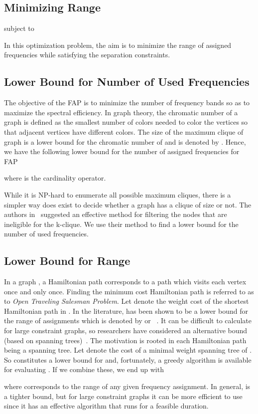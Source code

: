 \documentclass[10pt,twocolumn,twoside]{JCNtran}
\newcommand{\tbirkan}[1]{#1}
\begin{document}
\subsection{Minimizing Range}
\label{subsec_min_range}

subject to



In this optimization problem, the aim is to minimize the range of assigned frequencies while satisfying the separation constraints. 

\subsection{Lower Bound for Number of Used Frequencies}
\tbirkan{
The objective of the FAP is to minimize the number of frequency bands so as to maximize the spectral efficiency. In graph theory, the chromatic number of a graph is defined as the smallest number of colors needed to color the vertices so that adjacent vertices have different colors. The size of the maximum clique of graph  is a lower bound for the chromatic number of  and is denoted by . Hence, we have the following lower bound for the number of assigned frequencies for FAP

where  is the cardinality operator.
}

\tbirkan{While it is NP-hard to enumerate all possible maximum cliques, there is a simpler way does exist to decide whether a graph has a clique of size  or not. The authors in~\cite{modani2008largeMC} suggested an effective method for filtering the nodes that are ineligible for the k-clique. We use their method to find a lower bound for the number of used frequencies.}

\subsection{Lower Bound for Range}
\label{subsec_bound_range}
\tbirkan{In a graph , a Hamiltonian path corresponds to a path which visits each vertex once and only once. Finding the minimum cost Hamiltonian path is referred to as to \emph{Open Traveling Salesman Problem}. Let  denote the weight cost of the shortest Hamiltonian path in . In the literature,  has been shown to be a lower bound for the range of assignments which is denoted by  or ~\cite{allen1997frequencyAP,smith2000newLB,aardal2003modelsAS}. It can be difficult to calculate  for large constraint graphs, so researchers have considered an alternative bound (based on spanning trees)~\cite{allen1997frequencyAP,aardal2003modelsAS}. The motivation is rooted in each Hamiltonian path being a spanning tree. Let  denote the cost of a minimal weight spanning tree of . So  constitutes a lower bound for  and, fortunately, a greedy algorithm is available for evaluating . If we combine these, we end up with

where  corresponds to the range of any given frequency assignment. In general,  is a tighter bound, but for large constraint graphs it can be more efficient to use  since it has an effective algorithm that runs for a feasible duration. 
}
\end{document}

